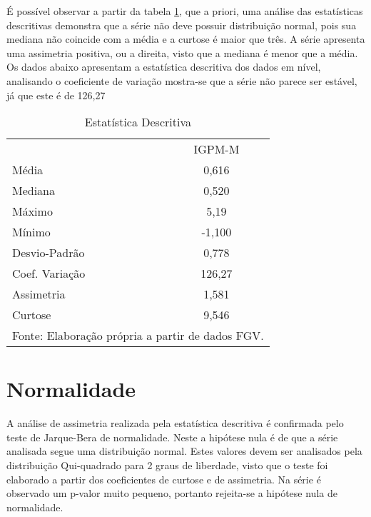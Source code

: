 \documentclass[a4paper,12pt,oneside,titlepage]{article}
\begin{document}
\fontsize{10pt}{\baselineskip}

É possível observar a partir da tabela \ref{estat_descritiva}, que a priori, uma análise
das estatísticas descritivas demonstra que a série não deve possuir
distribuição normal, pois sua mediana não coincide com a média e a
curtose é maior que três. A série apresenta uma assimetria positiva, ou
a direita, visto que a mediana é menor que a média. Os dados abaixo
apresentam a estatística descritiva dos dados em nível, analisando o
coeficiente de variação mostra-se que a série não parece ser estável, já que este é de
126,27%





\begin{table}[h!]
	\label{estat_descritiva}
	\caption{\footnotesize Estatística Descritiva}
	\centering
	\begin{tabular}{lc}
		\hline
		
		& IGPM-M  \\
		Média & 0,616  \\
		Mediana & 0,520  \\
		Máximo & 5,19  \\
		Mínimo & -1,100  \\
		Desvio-Padrão & 0,778  \\
		Coef. Variação & 126,27  \\
		Assimetria & 1,581  \\
		Curtose & 9,546  \\ 
		
		\hline
		\multicolumn{2}{c}{\footnotesize Fonte: Elaboração própria a partir de dados FGV.}
		
	\end{tabular}
	
\end{table}

\section*{Normalidade}

A análise de assimetria realizada pela estatística descritiva é
confirmada pelo teste de Jarque-Bera de normalidade. Neste a hipótese
nula é de que a série analisada segue uma distribuição normal. Estes
valores devem ser analisados pela distribuição Qui-quadrado para 2
graus de liberdade, visto que o teste foi elaborado a partir dos
coeficientes de curtose e de assimetria. Na série é
observado um p-valor muito pequeno, portanto rejeita-se a hipótese
nula de normalidade. 
\end{document}
